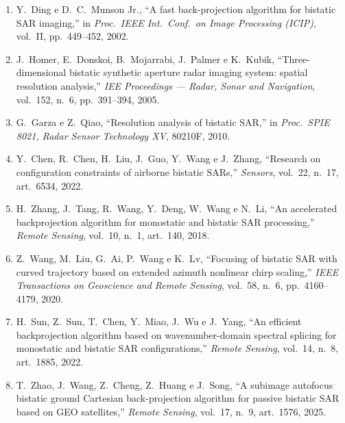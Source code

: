 \documentclass[12pt,a4paper,oneside]{book}
\theoremstyle{remark}
\theoremstyle{plain}
\theoremstyle{definition}
\begin{document}
\begin{enumerate}

  \item \label{ref:ding2002}
  Y.\ Ding e D.\ C.\ Munson Jr., ``A fast back-projection algorithm for
  bistatic SAR imaging,'' in \textit{Proc.\ IEEE Int.\ Conf.\ on Image
  Processing (ICIP)}, vol.\ II, pp.\ 449--452, 2002.

  \item \label{ref:homer2005}
  J.\ Homer, E.\ Donskoi, B.\ Mojarrabi, J.\ Palmer e K.\ Kubik,
  ``Three-dimensional bistatic synthetic aperture radar imaging system:
  spatial resolution analysis,'' \textit{IEE Proceedings --- Radar, Sonar
  and Navigation}, vol.\ 152, n.\ 6, pp.\ 391--394, 2005.

  \item \label{ref:garza2010}
  G.\ Garza e Z.\ Qiao, ``Resolution analysis of bistatic SAR,'' in
  \textit{Proc.\ SPIE 8021, Radar Sensor Technology XV}, 80210F, 2010.

  \item \label{ref:chen2022}
  Y.\ Chen, R.\ Chen, H.\ Liu, J.\ Guo, Y.\ Wang e J.\ Zhang, ``Research on
  configuration constraints of airborne bistatic SARs,'' \textit{Sensors},
  vol.\ 22, n.\ 17, art.\ 6534, 2022.

  \item \label{ref:zhang2018}
  H.\ Zhang, J.\ Tang, R.\ Wang, Y.\ Deng, W.\ Wang e N.\ Li, ``An
  accelerated backprojection algorithm for monostatic and bistatic SAR
  processing,'' \textit{Remote Sensing}, vol.\ 10, n.\ 1, art.\ 140, 2018.

  \item \label{ref:wang2020}
  Z.\ Wang, M.\ Liu, G.\ Ai, P.\ Wang e K.\ Lv, ``Focusing of bistatic SAR
  with curved trajectory based on extended azimuth nonlinear chirp
  scaling,'' \textit{IEEE Transactions on Geoscience and Remote Sensing},
  vol.\ 58, n.\ 6, pp.\ 4160--4179, 2020.

  \item \label{ref:sun2022}
  H.\ Sun, Z.\ Sun, T.\ Chen, Y.\ Miao, J.\ Wu e J.\ Yang, ``An efficient
  backprojection algorithm based on wavenumber-domain spectral splicing for
  monostatic and bistatic SAR configurations,'' \textit{Remote Sensing},
  vol.\ 14, n.\ 8, art.\ 1885, 2022.

  \item \label{ref:zhao2025}
  T.\ Zhao, J.\ Wang, Z.\ Cheng, Z.\ Huang e J.\ Song, ``A subimage
  autofocus bistatic ground Cartesian back-projection algorithm for passive
  bistatic SAR based on GEO satellites,'' \textit{Remote Sensing}, vol.\ 17,
  n.\ 9, art.\ 1576, 2025.


\end{enumerate}
\end{document}
